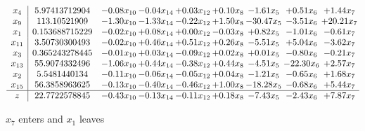 \documentclass[9pt]{article}
\begin{document}
 \[\begin{array}{c| c c@{\hskip 2pt} c@{\hskip 2pt} c@{\hskip 2pt} c@{\hskip 2pt} c@{\hskip 2pt} c@{\hskip 2pt} c@{\hskip 2pt} }
 x_{4}   &  5.97413712904 & -0.08 x_{10} & -0.04 x_{14} & +  0.03 x_{12} & +  0.10 x_{8} & -1.61 x_{5} & +  0.51 x_{6} & +  1.44 x_{7}\\
 x_{9}   &  113.10521909 & -1.30 x_{10} & -1.33 x_{14} & -0.22 x_{12} & +  1.50 x_{8} & -30.47 x_{5} & -3.51 x_{6} & + 20.21 x_{7}\\
 x_{1}   &  0.153688715229 & -0.02 x_{10} & +  0.08 x_{14} & +  0.00 x_{12} & -0.03 x_{8} & +  0.82 x_{5} & -1.01 x_{6} & -0.61 x_{7}\\
 x_{11}   &  3.50730300493 & -0.02 x_{10} & +  0.46 x_{14} & +  0.51 x_{12} & +  0.26 x_{8} & -5.51 x_{5} & +  5.04 x_{6} & -3.62 x_{7}\\
 x_{3}   &  0.365243278445 & -0.01 x_{10} & +  0.03 x_{14} & -0.09 x_{12} & +  0.02 x_{8} & +  0.01 x_{5} & -0.80 x_{6} & -0.21 x_{7}\\
 x_{13}   &  55.9074332496 & -1.06 x_{10} & +  0.44 x_{14} & -0.38 x_{12} & +  0.44 x_{8} & -4.51 x_{5} & -22.30 x_{6} & +  2.57 x_{7}\\
 x_{2}   &  5.5481440134 & -0.11 x_{10} & -0.06 x_{14} & -0.05 x_{12} & +  0.04 x_{8} & -1.21 x_{5} & -0.65 x_{6} & +  1.68 x_{7}\\
 x_{15}   &  56.3858963625 & -0.13 x_{10} & -0.40 x_{14} & -0.46 x_{12} & +  1.00 x_{8} & -18.28 x_{5} & -0.68 x_{6} & +  5.44 x_{7}\\
\hline
z    &  22.7722578845 & -0.43 x_{10} & -0.13 x_{14} & -0.11 x_{12} & +  0.18 x_{8} & -7.43 x_{5} & -2.43 x_{6} & +  7.87 x_{7}\\
\end{array}\]


 $ x_{7} $ enters and $ x_{1} $ leaves 
\end{document}
